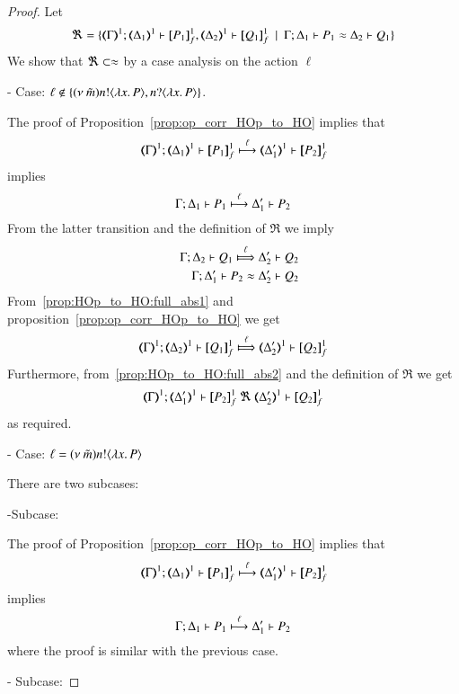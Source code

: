 \begin{proof}

	\noi Let
%
	\[
		\Re = \set{\horel{\mapt{\Gamma}^{1}}{\mapt{\Delta_1}^{1}}{\pmapp{P_1}{1}{f}}{,}{\mapt{\Delta_2}^{1}}{\pmapp{Q_1}{1}{f}} \setbar \horel{\Gamma}{\Delta_1}{P_1}{\wb}{\Delta_2}{Q_1}}
	\]
%
	We show that $\Re \subset \approx$ by a case analysis on the action $\ell$

	\noi - Case: $\ell \notin \{(\nu\ \tilde{m}) n ! \langle \lambda x.\,P \rangle, n ? \langle \lambda x.\,P \rangle\}$.

	\noi The proof of Proposition~\ref{prop:op_corr_HOp_to_HO} implies that
%
	\[
		\horel{\mapt{\Gamma}^{1}}{\mapt{\Delta_1}^{1}}{\pmapp{P_1}{1}{f}}{\hby{\ell}}{\mapt{\Delta_1'}^{1}}{\pmapp{P_2}{1}{f}}
	\]
%
	\noi implies
%
	\[
		\Gamma; \Delta_1 \vdash P_1 \stackrel{\ell}{\longmapsto} \Delta_1' \vdash P_2
	\]
%
	\noi From the latter transition and the definition of $\Re$ we imply
%
	\begin{eqnarray}
		&&\horel{\Gamma}{\Delta_2}{Q_1}{\Hby{\ell}}{\Delta_2'}{Q_2}
		\label{prop:HOp_to_HO:full_abs1}
		\\
		&&\horel{\Gamma}{\Delta_1'}{P_2}{\wb}{\Delta_2'}{Q_2}
		\label{prop:HOp_to_HO:full_abs2}
	\end{eqnarray}
%
	\noi From~\ref{prop:HOp_to_HO:full_abs1} and proposition~\ref{prop:op_corr_HOp_to_HO} we get
%
	\[
		\horel{\mapt{\Gamma}^{1}}{\mapt{\Delta_2}^{1}}{\pmapp{Q_1}{1}{f}}{\Hby{\ell}}{\mapt{\Delta_2'}^{1}}{\pmapp{Q_2}{1}{f}}
	\]
%
	\noi Furthermore, from~\ref{prop:HOp_to_HO:full_abs2} and the definition of $\Re$ we get
%
	\[
		\horel{\mapt{\Gamma}^{1}}{\mapt{\Delta_1'}^{1}}{\pmapp{P_2}{1}{f}}{\ \Re\ }{\mapt{\Delta_2'}^{1}}{\pmapp{Q_2}{1}{f}}
	\]
%
	\noi as required.

	\noi - Case: $\ell = (\nu\ \tilde{m}) n ! \langle \lambda x.\,P \rangle$

	\noi There are two subcases:

	\noi -Subcase:

	\noi The proof of Proposition~\ref{prop:op_corr_HOp_to_HO} implies that
%
	\[
		\horel{\mapt{\Gamma}^{1}}{\mapt{\Delta_1}^{1}}{\pmapp{P_1}{1}{f}}{\hby{\ell}}{\mapt{\Delta_1'}^{1}}{\pmapp{P_2}{1}{f}}
	\]
%
	\noi implies
%
	\[
		\Gamma; \Delta_1 \vdash P_1 \stackrel{\ell}{\longmapsto} \Delta_1' \vdash P_2
	\]
%
	\noi where the proof is similar with the previous case.

	\noi - Subcase:


\end{proof}
